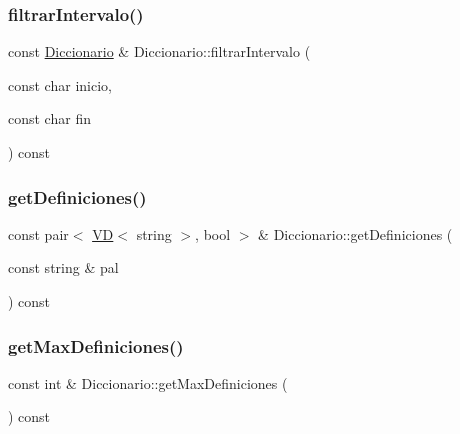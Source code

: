 \subsubsection{\texorpdfstring{filtrar\+Intervalo()}{filtrarIntervalo()}}
{\footnotesize\ttfamily const \mbox{\hyperlink{class_diccionario}{Diccionario}} \& Diccionario\+::filtrar\+Intervalo (\begin{DoxyParamCaption}\item[{const char}]{inicio,  }\item[{const char}]{fin }\end{DoxyParamCaption}) const}

\mbox{\label{class_diccionario_a3807bac7b070101ce9748c5fc61f57dc}} 
\subsubsection{\texorpdfstring{get\+Definiciones()}{getDefiniciones()}}
{\footnotesize\ttfamily const pair$<$ \mbox{\hyperlink{class_v_d}{VD}}$<$ string $>$, bool $>$ \& Diccionario\+::get\+Definiciones (\begin{DoxyParamCaption}\item[{const string \&}]{pal }\end{DoxyParamCaption}) const}

\mbox{\label{class_diccionario_ac37e5510381ead2192e66848e6e5f726}} 
\subsubsection{\texorpdfstring{get\+Max\+Definiciones()}{getMaxDefiniciones()}}
{\footnotesize\ttfamily const int \& Diccionario\+::get\+Max\+Definiciones (\begin{DoxyParamCaption}{ }\end{DoxyParamCaption}) const}

\mbox{\label{class_diccionario_a3c5554b8ec7dd6549d9ac0844510a49f}} 
